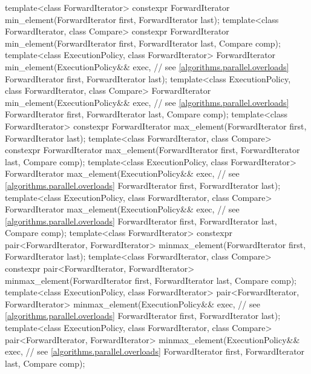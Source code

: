 \begin{codeblock}
{  template<class ForwardIterator>
    constexpr ForwardIterator min_element(ForwardIterator first, ForwardIterator last);
  template<class ForwardIterator, class Compare>
    constexpr ForwardIterator min_element(ForwardIterator first, ForwardIterator last,
                                          Compare comp);
  template<class ExecutionPolicy, class ForwardIterator>
    ForwardIterator min_element(ExecutionPolicy&& exec, // see \ref{algorithms.parallel.overloads}
                                ForwardIterator first, ForwardIterator last);
  template<class ExecutionPolicy, class ForwardIterator, class Compare>
    ForwardIterator min_element(ExecutionPolicy&& exec, // see \ref{algorithms.parallel.overloads}
                                ForwardIterator first, ForwardIterator last,
                                Compare comp);
  template<class ForwardIterator>
    constexpr ForwardIterator max_element(ForwardIterator first, ForwardIterator last);
  template<class ForwardIterator, class Compare>
    constexpr ForwardIterator max_element(ForwardIterator first, ForwardIterator last,
                                          Compare comp);
  template<class ExecutionPolicy, class ForwardIterator>
    ForwardIterator max_element(ExecutionPolicy&& exec, // see \ref{algorithms.parallel.overloads}
                                ForwardIterator first, ForwardIterator last);
  template<class ExecutionPolicy, class ForwardIterator, class Compare>
    ForwardIterator max_element(ExecutionPolicy&& exec, // see \ref{algorithms.parallel.overloads}
                                ForwardIterator first, ForwardIterator last,
                                Compare comp);
  template<class ForwardIterator>
    constexpr pair<ForwardIterator, ForwardIterator>
      minmax_element(ForwardIterator first, ForwardIterator last);
  template<class ForwardIterator, class Compare>
    constexpr pair<ForwardIterator, ForwardIterator>
      minmax_element(ForwardIterator first, ForwardIterator last, Compare comp);
  template<class ExecutionPolicy, class ForwardIterator>
    pair<ForwardIterator, ForwardIterator>
      minmax_element(ExecutionPolicy&& exec, // see \ref{algorithms.parallel.overloads}
                     ForwardIterator first, ForwardIterator last);
  template<class ExecutionPolicy, class ForwardIterator, class Compare>
    pair<ForwardIterator, ForwardIterator>
      minmax_element(ExecutionPolicy&& exec, // see \ref{algorithms.parallel.overloads}
                     ForwardIterator first, ForwardIterator last, Compare comp);

}
\end{codeblock}
